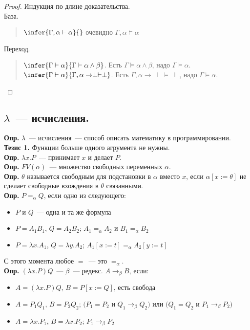 \documentclass{article}
\begin{document}
	\begin{proof}
		Индукция по длине доказательства. \\
		База.
		\begin{quote}
			$\infer{\Gamma, \alpha \vdash \alpha}{}$ очевидно $\Gamma, \alpha \vDash \alpha$
		\end{quote}
		Переход.
		\begin{quote}
			$\infer{\Gamma \vdash \alpha}{\Gamma \vdash \alpha \wedge \beta}$. Есть $\Gamma \vDash \alpha \wedge \beta$, надо $\Gamma \vDash \alpha$. \\
			$\infer{\Gamma \vdash \alpha}{\Gamma, \alpha \rightarrow \perp \vdash \perp}$. Есть $\Gamma, \alpha \rightarrow \perp \vDash \perp$, надо $\Gamma \vDash \alpha$.
		\end{quote}
	\end{proof}
	\subsection{$\lambda$~--- исчисления.}
	\textbf{Опр.} $\lambda$~--- исчисления~--- способ описать математику в программировании. \\
	\textbf{Тезис 1.} Функции больше одного агрумента не нужны. \\
	\textbf{Опр.} $\lambda x. P$~--- принимает $x$ и делает $P$. \\
	\textbf{Опр.} $FV(\alpha)$~--- множество свободных переменных $\alpha$. \\
	\textbf{Опр.} $\theta$ называется свободным для подстановки в $\alpha$ вместо $x$, если $\alpha [x := \theta]$ не сделает свободные вхождения в $\theta$ связанными. \\
	\textbf{Опр.} $P =_{\alpha} Q$, если одно из следующего:
	\begin{itemize}
		\item $P$ и $Q$~--- одна и та же формула
		\item $P = A_1 B_1$, $Q = A_2 B_2$; $A_1 =_{\alpha} A_2$ и $B_1 =_{\alpha} B_2$
		\item $P = \lambda x. A_1$, $Q = \lambda y. A_2$; $A_1[x := t] =_{\alpha} A_2 [y := t]$
	\end{itemize}
	С этого момента любое $=$~--- это $=_{\alpha}$. \\
	\textbf{Опр.} $(\lambda x. P)Q$~--- $\beta$~--- редекс. $A \rightarrow_{\beta} B$, если:
	\begin{itemize}
		\item $A = (\lambda x. P)Q$, $B = P[x := Q]$, есть свобода
		\item $A = P_1Q_1$, $B = P_2Q_2$; $(P_1 = P_2$ и $Q_1 \rightarrow_{\beta} Q_2)$ или $(Q_1 = Q_2$ и $P_1 \rightarrow_{\beta} P_2)$
		\item $A = \lambda x. P_1$, $B = \lambda x. P_2$; $P_1 \rightarrow_{\beta} P_2$
	\end{itemize}
\end{document}

